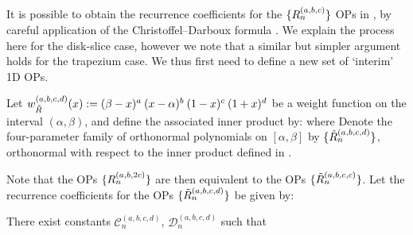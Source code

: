 It is possible to obtain the recurrence coefficients for the $\{R_n^{(a,b,c)}\}$ OPs in , by careful application of the Christoffel--Darboux formula \cite[18.2.12]{DLMF}. We explain the process here for the disk-slice case, however we note that a similar but simpler argument holds for the trapezium case. We thus first need to define a new set of `interim' 1D OPs.
\begin{definition}\label{def:ds:InterimOPconstruction}
Let $w_{\tilde{R}}^{(a,b,c,d)}(x) := (\beta - x)^a \: (x - \alpha)^{b} \: (1-x)^{c} \: (1+x)^{d} $ be a weight function on the interval $(\alpha, \beta)$, and define the associated inner product by:
where
Denote the four-parameter family of orthonormal polynomials on $[\alpha,\beta]$ by $\{\tilde{R}_n^{(a,b,c,d)}\}$, orthonormal with respect to the inner product defined in .
\end{definition}
Note that the OPs $\{R_n^{(a,b,2c)}\}$ are then equivalent to the OPs $\{\tilde{R}_n^{(a,b,c,c)}\}$. Let the recurrence coefficients for the OPs $\{\tilde{R}_n^{(a,b,c,d)}\}$ be given by:
\begin{proposition}
There exist constants $\mathcal{C}_n^{(a,b,c,d)}$, $\mathcal{D}_n^{(a,b,c,d)}$ such that
\end{proposition}

